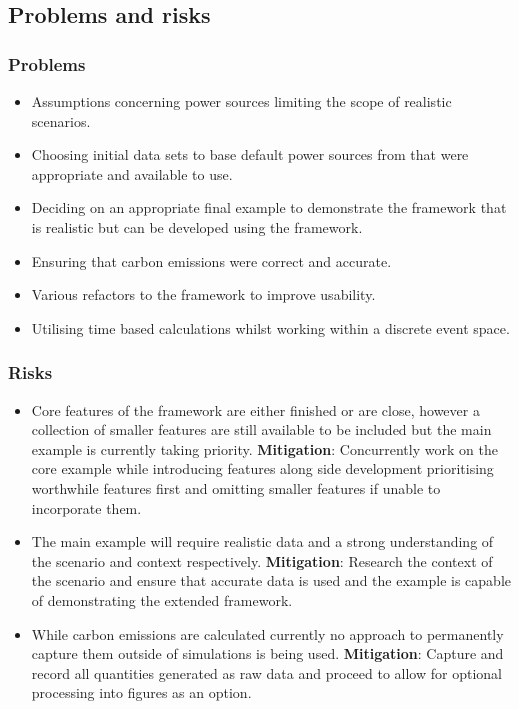 \documentclass[11pt]{article}
\begin{document}
\subsection{Problems and risks}\label{problems-and-risks}

\subsubsection{Problems}\label{problems}

\begin{itemize}[itemsep=0pt]
\item Assumptions concerning power sources limiting the scope of realistic scenarios.
\item Choosing initial data sets to base default power sources from that were appropriate and available to use.
\item Deciding on an appropriate final example to demonstrate the framework that is realistic but can be developed using the framework.
\item Ensuring that carbon emissions were correct and accurate.
\item Various refactors to the framework to improve usability.
\item Utilising time based calculations whilst working within a discrete event space.
\end{itemize}

\subsubsection{Risks}\label{risks}

\begin{itemize}[itemsep=0pt]
    \item Core features of the framework are either finished or are close, however a collection of smaller features are still available to be included but the main example is currently taking priority.
        \textbf{Mitigation}: Concurrently work on the core example while introducing features along side development prioritising worthwhile features first and omitting smaller features if unable to incorporate them.
    \item The main example will require realistic data and a strong understanding of the scenario and context respectively.
        \textbf{Mitigation}: Research the context of the scenario and ensure that accurate data is used and the example is capable of demonstrating the extended framework.
    \item While carbon emissions are calculated currently no approach to permanently capture them outside of simulations is being used.
        \textbf{Mitigation}: Capture and record all quantities generated as raw data and proceed to allow for optional processing into figures as an option.
\end{itemize}
\end{document}
